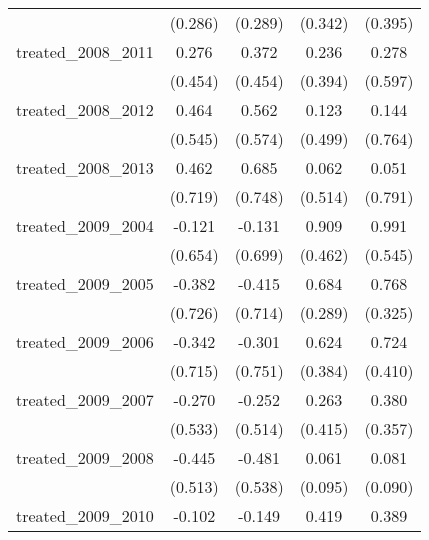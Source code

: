 {\begin{tabular}{l*{4}{c}}
            &     (0.286)         &     (0.289)         &     (0.342)         &     (0.395)         \\
[1em]
treated\_2008\_2011&       0.276         &       0.372         &       0.236         &       0.278         \\
            &     (0.454)         &     (0.454)         &     (0.394)         &     (0.597)         \\
[1em]
treated\_2008\_2012&       0.464         &       0.562         &       0.123         &       0.144         \\
            &     (0.545)         &     (0.574)         &     (0.499)         &     (0.764)         \\
[1em]
treated\_2008\_2013&       0.462         &       0.685         &       0.062         &       0.051         \\
            &     (0.719)         &     (0.748)         &     (0.514)         &     (0.791)         \\
[1em]
treated\_2009\_2004&      -0.121         &      -0.131         &       0.909\sym{*}  &       0.991         \\
            &     (0.654)         &     (0.699)         &     (0.462)         &     (0.545)         \\
[1em]
treated\_2009\_2005&      -0.382         &      -0.415         &       0.684\sym{*}  &       0.768\sym{*}  \\
            &     (0.726)         &     (0.714)         &     (0.289)         &     (0.325)         \\
[1em]
treated\_2009\_2006&      -0.342         &      -0.301         &       0.624         &       0.724         \\
            &     (0.715)         &     (0.751)         &     (0.384)         &     (0.410)         \\
[1em]
treated\_2009\_2007&      -0.270         &      -0.252         &       0.263         &       0.380         \\
            &     (0.533)         &     (0.514)         &     (0.415)         &     (0.357)         \\
[1em]
treated\_2009\_2008&      -0.445         &      -0.481         &       0.061         &       0.081         \\
            &     (0.513)         &     (0.538)         &     (0.095)         &     (0.090)         \\
[1em]
treated\_2009\_2010&      -0.102         &      -0.149         &       0.419         &       0.389         \\

\end{tabular}}
